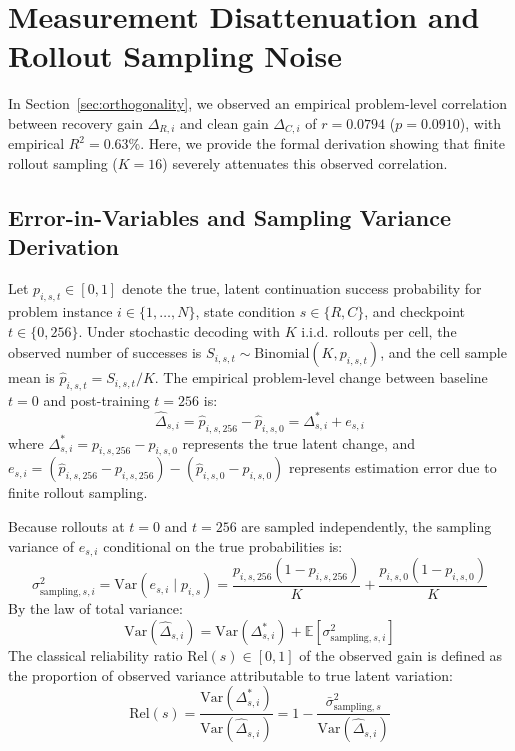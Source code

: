 \documentclass{article}
\begin{document}
\section{Measurement Disattenuation and Rollout Sampling Noise}
\label{app:disattenuation}

In Section~\ref{sec:orthogonality}, we observed an empirical problem-level correlation between recovery gain $\Delta_{R,i}$ and clean gain $\Delta_{C,i}$ of $r = 0.0794$ ($p = 0.0910$), with empirical $R^2 = 0.63\%$. Here, we provide the formal derivation showing that finite rollout sampling ($K=16$) severely attenuates this observed correlation.

\subsection{Error-in-Variables and Sampling Variance Derivation}
Let $p_{i,s,t} \in [0, 1]$ denote the true, latent continuation success probability for problem instance $i \in \{1, \dots, N\}$, state condition $s \in \{R, C\}$, and checkpoint $t \in \{0, 256\}$.
Under stochastic decoding with $K$ i.i.d. rollouts per cell, the observed number of successes is $S_{i,s,t} \sim \text{Binomial}(K, p_{i,s,t})$, and the cell sample mean is $\hat{p}_{i,s,t} = S_{i,s,t} / K$.
The empirical problem-level change between baseline $t=0$ and post-training $t=256$ is:
\begin{equation}
\hat{\Delta}_{s,i} = \hat{p}_{i,s,256} - \hat{p}_{i,s,0} = \Delta_{s,i}^* + e_{s,i}
\end{equation}
where $\Delta_{s,i}^* = p_{i,s,256} - p_{i,s,0}$ represents the true latent change, and $e_{s,i} = (\hat{p}_{i,s,256} - p_{i,s,256}) - (\hat{p}_{i,s,0} - p_{i,s,0})$ represents estimation error due to finite rollout sampling.

Because rollouts at $t=0$ and $t=256$ are sampled independently, the sampling variance of $e_{s,i}$ conditional on the true probabilities is:
\begin{equation}
\sigma^2_{\text{sampling},s,i} = \text{Var}(e_{s,i} \mid p_{i,s}) = \frac{p_{i,s,256}(1 - p_{i,s,256})}{K} + \frac{p_{i,s,0}(1 - p_{i,s,0})}{K}
\end{equation}
By the law of total variance:
\begin{equation}
\text{Var}(\hat{\Delta}_{s,i}) = \text{Var}(\Delta_{s,i}^*) + \mathbb{E}\left[\sigma^2_{\text{sampling},s,i}\right]
\end{equation}
The classical reliability ratio $\text{Rel}(s) \in [0, 1]$ of the observed gain is defined as the proportion of observed variance attributable to true latent variation:
\begin{equation}
\text{Rel}(s) = \frac{\text{Var}(\Delta_{s,i}^*)}{\text{Var}(\hat{\Delta}_{s,i})} = 1 - \frac{\bar{\sigma}^2_{\text{sampling},s}}{\text{Var}(\hat{\Delta}_{s,i})}
\end{equation}
\end{document}
